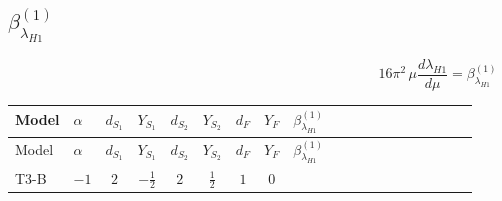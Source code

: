 \documentclass{article}
\begin{document}
\begin{landscape}
\section*{$\beta_{\lambda_{H1}}^{(1)}$}
\[16\pi^2\,\mu\frac{d \lambda_{H1}}{d\mu}=\beta_{\lambda_{H1}}^{(1)}\]
\tiny
\begin{longtable}{@{}llcccccc >{\raggedright\arraybackslash}p{0.54\linewidth}@{}}
\toprule
Model & $\alpha$ & $d_{S_1}$ & $Y_{S_1}$ & $d_{S_2}$ & $Y_{S_2}$ & $d_F$ & $Y_F$ & $\beta_{\lambda_{H1}}^{(1)}$ \\
\midrule
\endfirsthead
\toprule
Model & $\alpha$ & $d_{S_1}$ & $Y_{S_1}$ & $d_{S_2}$ & $Y_{S_2}$ & $d_F$ & $Y_F$ & $\beta_{\lambda_{H1}}^{(1)}$ \\
\midrule
\endhead
T3-B & $-1$ & $2$ & $-\frac{1}{2}$ & $2$ & $\frac{1}{2}$ & $1$ & $0$ & \scriptsize\adjustbox{max width=\linewidth}{$\begin{gathered} {\lambda_{H1}} (2 \operatorname{Tr}\!\left({y_1}\,\left({y_1}\right)^{\dagger}\right)+6 \operatorname{Tr}\!\left({Y_d}\,\left({Y_d}\right)^{\dagger}\right)+2 \operatorname{Tr}\!\left({Y_e}\,\left({Y_e}\right)^{\dagger}\right)+6 \operatorname{Tr}\!\left({Y_u}\,\left({Y_u}\right)^{\dagger}\right)) \\ +{\lambda_{H H^\dagger S_1^\dagger S_2^\dagger}^{\rm Cross}} \left(\frac{1}{2} \operatorname{Tr}\!\left({y_1}\,\left({y_2}\right)^{\dagger}\right)+4 \left({\lambda_{H H^\dagger S_1^\dagger S_2^\dagger}^{\rm Cross}}\right)^{*}+3 \left({\lambda_{S_1 S_1^{\dagger 2}S_2^\dagger}}\right)^{*}\right) \\ +\frac{1}{2} \left({\lambda_{H H^\dagger S_1^\dagger S_2^\dagger}^{\rm Cross}}\right)^{*} \operatorname{Tr}\!\left({y_2}\,\left({y_1}\right)^{\dagger}\right) \\ -2 \operatorname{Tr}\!\left({y_1}\,\left({y_1}\right)^{\dagger}\,{Y_e}\,\left({Y_e}\right)^{\dagger}\right) \\ +24 {\lambda_{H^\dagger H^\dagger S_1^\dagger S_1^\dagger}} \left({\lambda_{H^\dagger H^\dagger S_1^\dagger S_1^\dagger}}\right)^{*} \\ +3 {\lambda_{S_1 S_1^{\dagger 2}S_2^\dagger}} \left({\lambda_{H H^\dagger S_1^\dagger S_2^\dagger}^{\rm Cross}}\right)^{*} \\ +6 {\lambda_{T3}} \left({\lambda_{T3}}\right)^{*} \\ +\frac{9 {g_2}^4}{4} \\ -9 {g_2}^2 {\lambda_{H1}} \\ +\frac{3 {g_Y}^4}{4} \\ -3 {g_Y}^2 {\lambda_{H1}} \\ +4 {\lambda_{12}} {\lambda_{H2}} \\ +6 {\lambda_H} {\lambda_{H1}} \\ +4 {\lambda_{H1}}^2 \\ +6 {\lambda_{H1}} {\lambda_{S_1}} \\ +\frac{3 {\lambda_{H1}^{\rm Adj}}^2}{4}\end{gathered}$} \\

\end{longtable}
\end{landscape}
\end{document}
